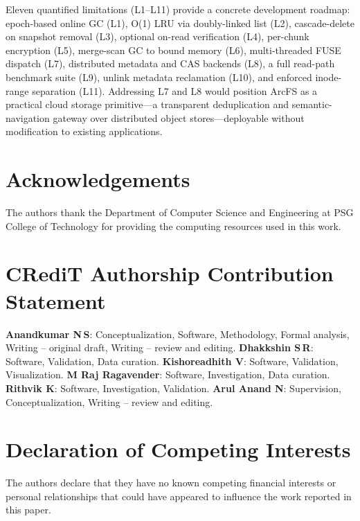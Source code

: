 \documentclass[5p,times]{elsarticle}
\begin{document}
Eleven quantified limitations (L1--L11) provide a concrete development
roadmap: epoch-based online GC (L1), O(1) LRU via doubly-linked list
(L2), cascade-delete on snapshot removal (L3), optional on-read
verification (L4), per-chunk encryption (L5), merge-scan GC to bound
memory (L6), multi-threaded FUSE dispatch (L7), distributed metadata
and CAS backends (L8), a full read-path benchmark suite (L9), unlink
metadata reclamation (L10), and enforced inode-range separation (L11).
Addressing L7 and L8 would position ArcFS as a practical cloud storage
primitive---a transparent deduplication and semantic-navigation gateway
over distributed object stores---deployable without modification to
existing applications.


\section*{Acknowledgements}
The authors thank the Department of Computer Science and Engineering at
PSG College of Technology for providing the computing resources used in
this work.

\section*{CRediT Authorship Contribution Statement}
\textbf{Anandkumar N\,S}: Conceptualization, Software, Methodology,
Formal analysis, Writing -- original draft, Writing -- review and editing.
\textbf{Dhakkshin S\,R}: Software, Validation, Data curation.
\textbf{Kishoreadhith V}: Software, Validation, Visualization.
\textbf{M Raj Ragavender}: Software, Investigation, Data curation.
\textbf{Rithvik K}: Software, Investigation, Validation.
\textbf{Arul Anand N}: Supervision, Conceptualization,
Writing -- review and editing.

\section*{Declaration of Competing Interests}
The authors declare that they have no known competing financial interests
or personal relationships that could have appeared to influence the work
reported in this paper.
\end{document}
